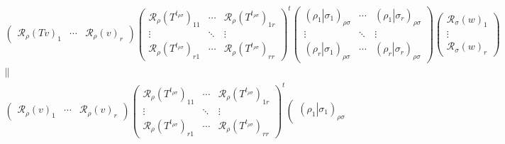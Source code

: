 \documentclass[aps,preprint]{revtex4}
\begin{document}
\begin{gather}
\left( 
\begin{array}{ccc}
\mathcal{R}_{\rho }\left( Tv\right) _{1} & \cdots & \mathcal{R}_{\rho
}\left( v\right) _{r}%
\end{array}%
\right) \left( 
\begin{array}{ccc}
\mathcal{R}_{\rho }\left( T^{t_{\rho \sigma }}\right) _{11} & \cdots & 
\mathcal{R}_{\rho }\left( T^{t_{\rho \sigma }}\right) _{1r} \\ 
\vdots & \ddots & \vdots \\ 
\mathcal{R}_{\rho }\left( T^{t_{\rho \sigma }}\right) _{r1} & \cdots & 
\mathcal{R}_{\rho }\left( T^{t_{\rho \sigma }}\right) _{rr}%
\end{array}%
\right) ^{t}\left( 
\begin{array}{ccc}
\left( \left. \rho _{1}\right\vert \sigma _{1}\right) _{\rho \sigma } & 
\cdots & \left( \left. \rho _{1}\right\vert \sigma _{r}\right) _{\rho \sigma
} \\ 
\vdots & \ddots & \vdots \\ 
\left( \left. \rho _{r}\right\vert \sigma _{1}\right) _{\rho \sigma } & 
\cdots & \left( \left. \rho _{r}\right\vert \sigma _{r}\right) _{\rho \sigma
}%
\end{array}%
\right) \left( 
\begin{array}{c}
\mathcal{R}_{\sigma }\left( w\right) _{1} \\ 
\vdots \\ 
\mathcal{R}_{\sigma }\left( w\right) _{r}%
\end{array}%
\right) \\
\parallel \\
\left( 
\begin{array}{ccc}
\mathcal{R}_{\rho }\left( v\right) _{1} & \cdots & \mathcal{R}_{\rho }\left(
v\right) _{r}%
\end{array}%
\right) \left( 
\begin{array}{ccc}
\mathcal{R}_{\rho }\left( T^{t_{\rho \sigma }}\right) _{11} & \cdots & 
\mathcal{R}_{\rho }\left( T^{t_{\rho \sigma }}\right) _{1r} \\ 
\vdots & \ddots & \vdots \\ 
\mathcal{R}_{\rho }\left( T^{t_{\rho \sigma }}\right) _{r1} & \cdots & 
\mathcal{R}_{\rho }\left( T^{t_{\rho \sigma }}\right) _{rr}%
\end{array}%
\right) ^{t}\left( 
\begin{array}{ccc}
\left( \left. \rho _{1}\right\vert \sigma _{1}\right) _{\rho \sigma } & 

\end{array}
\end{gather}
\end{document}
